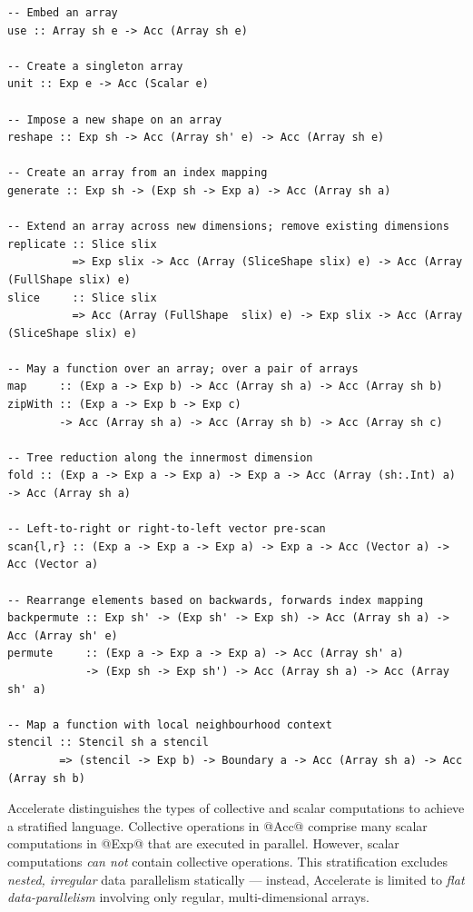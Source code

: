 \begin{lstlisting}[style=haskell,
    numbers=none,
    float=t,
    label={lst:acc_operations},
    caption={[Core Accelerate array operations] Summary of Accelerate's core
        collective array operations, omitting \code{Shape} and \code{Elt} class
        constraints for brevity. In addition, there are other flavours of folds
        and scans as well as segmented versions of these.}]
-- Embed an array
use :: Array sh e -> Acc (Array sh e)

-- Create a singleton array
unit :: Exp e -> Acc (Scalar e)

-- Impose a new shape on an array
reshape :: Exp sh -> Acc (Array sh' e) -> Acc (Array sh e)

-- Create an array from an index mapping
generate :: Exp sh -> (Exp sh -> Exp a) -> Acc (Array sh a)

-- Extend an array across new dimensions; remove existing dimensions
replicate :: Slice slix
          => Exp slix -> Acc (Array (SliceShape slix) e) -> Acc (Array (FullShape slix) e)
slice     :: Slice slix
          => Acc (Array (FullShape  slix) e) -> Exp slix -> Acc (Array (SliceShape slix) e)

-- May a function over an array; over a pair of arrays
map     :: (Exp a -> Exp b) -> Acc (Array sh a) -> Acc (Array sh b)
zipWith :: (Exp a -> Exp b -> Exp c)
        -> Acc (Array sh a) -> Acc (Array sh b) -> Acc (Array sh c)

-- Tree reduction along the innermost dimension
fold :: (Exp a -> Exp a -> Exp a) -> Exp a -> Acc (Array (sh:.Int) a) -> Acc (Array sh a)

-- Left-to-right or right-to-left vector pre-scan
scan{l,r} :: (Exp a -> Exp a -> Exp a) -> Exp a -> Acc (Vector a) -> Acc (Vector a)

-- Rearrange elements based on backwards, forwards index mapping
backpermute :: Exp sh' -> (Exp sh' -> Exp sh) -> Acc (Array sh a) -> Acc (Array sh' e)
permute     :: (Exp a -> Exp a -> Exp a) -> Acc (Array sh' a)
            -> (Exp sh -> Exp sh') -> Acc (Array sh a) -> Acc (Array sh' a)

-- Map a function with local neighbourhood context
stencil :: Stencil sh a stencil
        => (stencil -> Exp b) -> Boundary a -> Acc (Array sh a) -> Acc (Array sh b)
\end{lstlisting}

Accelerate distinguishes the types of collective and scalar computations to
achieve a stratified language. Collective operations in @Acc@ comprise many
scalar computations in @Exp@ that are executed in parallel. However, scalar
computations \emph{can not} contain collective operations. This stratification
excludes \emph{nested, irregular} data parallelism statically --- instead,
Accelerate is limited to \emph{flat data-parallelism} involving only regular,
multi-dimensional arrays.

